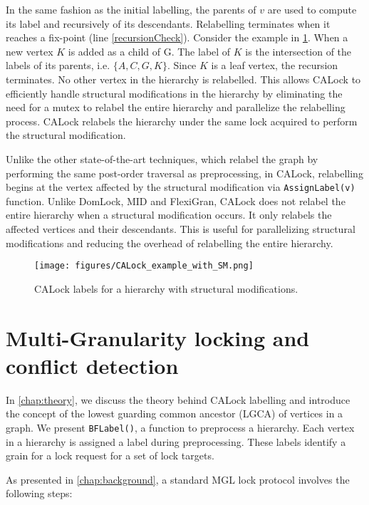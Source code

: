 In the same fashion as the initial labelling, the parents of $v$ are used to compute its label and recursively of its descendants. Relabelling terminates when it reaches a fix-point (line \ref{recursionCheck}). 
Consider the example in \cref{fig:CAstructuralModification}. When a new vertex $K$ is added as a child of G. The label of $K$ is the intersection of the labels of its parents, i.e. $\{A, C, G, K\}$. Since $K$ is a leaf vertex, the recursion terminates. 
No other vertex in the hierarchy is relabelled. 
This allows CALock to efficiently handle structural modifications in the hierarchy by eliminating the need for a mutex to relabel the entire hierarchy and parallelize the relabelling process. CALock relabels the hierarchy under the same lock acquired to perform the structural modification.

Unlike the other state-of-the-art techniques, which relabel the graph by performing the same post-order traversal as preprocessing, in CALock, relabelling begins at the vertex affected by the structural modification via \lstinline|AssignLabel(v)| function. 
Unlike DomLock, MID and FlexiGran, CALock does not relabel the entire hierarchy when a structural modification occurs. 
It only relabels the affected vertices and their descendants. 
This is useful for parallelizing structural modifications and reducing the overhead of relabelling the entire hierarchy.

\begin{figure}
	\centering
	\captionsetup{justification=centering}
	\texttt{[image: figures/CALock\_example\_with\_SM.png]}
	\caption{CALock labels for a hierarchy with structural modifications.}
	\label{fig:CAstructuralModification}
\end{figure}


\section{Multi-Granularity locking and conflict detection} \label{chap:calock}


In \cref{chap:theory}, we discuss the theory behind CALock labelling and introduce the concept of the lowest guarding common ancestor (LGCA) of vertices in a graph. We present \lstinline|BFLabel()|, a function to preprocess a hierarchy. Each vertex in a hierarchy is assigned a label during preprocessing. These labels identify a grain for a lock request for a set of lock targets. 


As presented in \cref{chap:background}, a standard MGL lock protocol involves the following steps:

